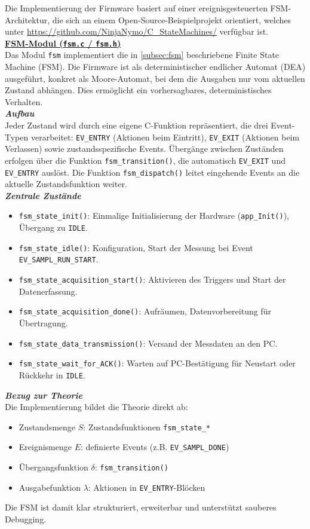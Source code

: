 \documentclass[a4paper, portrait, 12pt]{scrartcl} %
\begin{document}
Die Implementierung der Firmware basiert auf einer ereignisgesteuerten FSM-Architektur, 
die sich an einem Open-Source-Beispielprojekt orientiert, welches unter \url{https://github.com/NinjaNymo/C_StateMachines/} verfügbar ist.\\

\underline{\textbf{FSM-Modul (\texttt{fsm.c} / \texttt{fsm.h})}}\\
Das Modul \texttt{fsm} implementiert die in \autoref{subsec:fsm} beschriebene Finite State Machine (FSM). 
Die Firmware ist als deterministischer endlicher Automat (DEA) ausgeführt, konkret als Moore-Automat, bei dem die Ausgaben nur vom aktuellen Zustand abhängen. 
Dies ermöglicht ein vorhersagbares, deterministisches Verhalten.\\

\textbf{\emph{Aufbau}}\\
Jeder Zustand wird durch eine eigene C-Funktion repräsentiert, die drei Event-Typen verarbeitet: 
\texttt{EV\_ENTRY} (Aktionen beim Eintritt), 
\texttt{EV\_EXIT} (Aktionen beim Verlassen) 
sowie zustandsspezifische Events. 
Übergänge zwischen Zuständen erfolgen über die Funktion \texttt{fsm\_transition()}, die automatisch \texttt{EV\_EXIT} und \texttt{EV\_ENTRY} auslöst. 
Die Funktion \texttt{fsm\_dispatch()} leitet eingehende Events an die aktuelle Zustandsfunktion weiter.\\

\textbf{\emph{Zentrale Zustände}}
\begin{itemize}
	\footnotesize
    \item \texttt{fsm\_state\_init()}: Einmalige Initialisierung der Hardware (\texttt{app\_Init()}), Übergang zu \texttt{IDLE}.
    \item \texttt{fsm\_state\_idle()}: Konfiguration, Start der Messung bei Event \texttt{EV\_SAMPL\_RUN\_START}.
    \item \texttt{fsm\_state\_acquisition\_start()}: Aktivieren des Triggers und Start der Datenerfassung.
    \item \texttt{fsm\_state\_acquisition\_done()}: Aufräumen, Datenvorbereitung für Übertragung.
    \item \texttt{fsm\_state\_data\_transmission()}: Versand der Messdaten an den PC.
    \item \texttt{fsm\_state\_wait\_for\_ACK()}: Warten auf PC-Bestätigung für Neustart oder Rückkehr in \texttt{IDLE}.
\end{itemize}

\textbf{\emph{Bezug zur Theorie}}\\
Die Implementierung bildet die Theorie direkt ab:
\begin{itemize}
	\footnotesize
    \item Zustandsmenge $S$: Zustandsfunktionen \texttt{fsm\_state\_*}
    \item Ereignismenge $E$: definierte Events (z.B. \texttt{EV\_SAMPL\_DONE})
    \item Übergangsfunktion $\delta$: \texttt{fsm\_transition()}
    \item Ausgabefunktion $\lambda$: Aktionen in \texttt{EV\_ENTRY}-Blöcken
\end{itemize}
Die FSM ist damit klar strukturiert, erweiterbar und unterstützt sauberes Debugging.
\pagebreak
\end{document}
